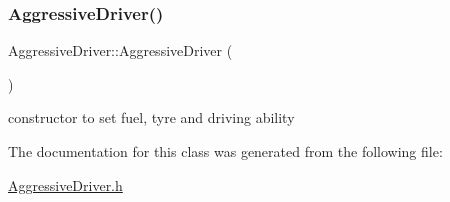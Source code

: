 \subsubsection{\texorpdfstring{Aggressive\+Driver()}{AggressiveDriver()}}
{\footnotesize\ttfamily Aggressive\+Driver\+::\+Aggressive\+Driver (\begin{DoxyParamCaption}{ }\end{DoxyParamCaption})\hspace{0.3cm}{\ttfamily [inline]}}

constructor to set fuel, tyre and driving ability 

The documentation for this class was generated from the following file\+:\begin{DoxyCompactItemize}
\item 
\mbox{\hyperlink{_aggressive_driver_8h}{Aggressive\+Driver.\+h}}\end{DoxyCompactItemize}

